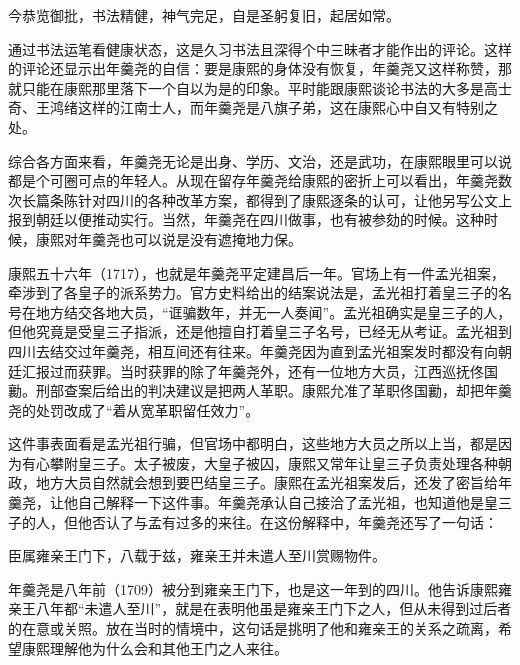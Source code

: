 
\begin{bookquote}今恭览御批，书法精健，神气完足，自是圣躬复旧，起居如常。\end{bookquote}


通过书法运笔看健康状态，这是久习书法且深得个中三昧者才能作出的评论。这样的评论还显示出年羹尧的自信：要是康熙的身体没有恢复，年羹尧又这样称赞，那就只能在康熙那里落下一个自以为是的印象。平时能跟康熙谈论书法的大多是高士奇、王鸿绪这样的江南士人，而年羹尧是八旗子弟，这在康熙心中自又有特别之处。



综合各方面来看，年羹尧无论是出身、学历、文治，还是武功，在康熙眼里可以说都是个可圈可点的年轻人。从现在留存年羹尧给康熙的密折上可以看出，年羹尧数次长篇条陈针对四川的各种改革方案，都得到了康熙逐条的认可，让他另写公文上报到朝廷以便推动实行。当然，年羹尧在四川做事，也有被参劾的时候。这种时候，康熙对年羹尧也可以说是没有遮掩地力保。



康熙五十六年（1717），也就是年羹尧平定建昌后一年。官场上有一件孟光祖案，牵涉到了各皇子的派系势力。官方史料给出的结案说法是，孟光祖打着皇三子的名号在地方结交各地大员，“诓骗数年，并无一人奏闻”。孟光祖确实是皇三子的人，但他究竟是受皇三子指派，还是他擅自打着皇三子名号，已经无从考证。孟光祖到四川去结交过年羹尧，相互间还有往来。年羹尧因为直到孟光祖案发时都没有向朝廷汇报过而获罪。当时获罪的除了年羹尧外，还有一位地方大员，江西巡抚佟国勷。刑部查案后给出的判决建议是把两人革职。康熙允准了革职佟国勷，却把年羹尧的处罚改成了“着从宽革职留任效力”。



这件事表面看是孟光祖行骗，但官场中都明白，这些地方大员之所以上当，都是因为有心攀附皇三子。太子被废，大皇子被囚，康熙又常年让皇三子负责处理各种朝政，地方大员自然就会想到要巴结皇三子。康熙在孟光祖案发后，还发了密旨给年羹尧，让他自己解释一下这件事。年羹尧承认自己接洽了孟光祖，也知道他是皇三子的人，但他否认了与孟有过多的来往。在这份解释中，年羹尧还写了一句话：



\begin{bookquote}臣属雍亲王门下，八载于兹，雍亲王并未遣人至川赏赐物件。\end{bookquote}


年羹尧是八年前（1709）被分到雍亲王门下，也是这一年到的四川。他告诉康熙雍亲王八年都“未遣人至川”，就是在表明他虽是雍亲王门下之人，但从未得到过后者的在意或关照。放在当时的情境中，这句话是挑明了他和雍亲王的关系之疏离，希望康熙理解他为什么会和其他王门之人来往。


